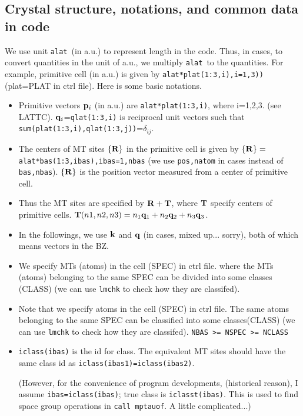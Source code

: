 \documentclass[a4paper,10pt,epsf,fleqn]{article}
\def\bfp{{\bf p}}
\newcommand{\bfq}{{\bf q}}
\newcommand{\bfk}{{\bf k}}
\newcommand{\bfT}{{\bf T}}
\newcommand{\bfR}{{\bf R}}
\newcommand{\io}[1]{{\sf  #1}}
\newcommand{\raw}[1]{{\tt #1}}
\newcommand{\alat}{{\raw{alat}}}
\begin{document}
\subsection{Crystal structure, notations, and common data in code}
\label{how to represent crystalstructure and symmetry}
We use unit \alat\ (in a.u.) to represent length in the code.
Thus, in cases, to convert quantities in the unit of a.u., we
multiply \alat\ to the quantities.
For example, primitive cell (in a.u.) is given by 
\verb!alat*plat(1:3,i),i=1,3))! (plat=PLAT in ctrl file).
Here is some basic notations.
\begin{itemize}
\item
Primitive vectors $\bfp_i$ (in a.u.) are
\raw{alat*plat(1:3,i)}, where i=1,2,3. (see \io{LATTC}).
$\bfq_i$=\raw{qlat(1:3,i)} is reciprocal unit vectors such that
\raw{sum(plat(1:3,i),qlat(1:3,j))}=$\delta_{ij}$.

\item
The centers of MT sites $\{\bfR\}$ in the primitive cell
is given by $\{\bfR\}=$\raw{alat*bas(1:3,ibas),ibas=1,nbas} 
(we use \verb#pos,natom# in cases instead of \verb#bas,nbas#).
$\{\bfR\}$ is the position vector measured from 
a center of primitive cell.

\item
Thus the MT sites are specified by $\bfR+\bfT$, where $\bfT$ specify
centers of primitive 
cells. $\bfT(n1,n2,n3)=n_1 \bfq_1+n_2 \bfq_2 + n_3 \bfq_3$.

\item
In the followings, we use $\bfk$ and $\bfq$
(in cases, mixed up... sorry), both of
which means vectors in the BZ.

\item
  We specify MTs (atoms) in the cell (SPEC) in ctrl file.
  where the MTs (atoms) belonging to the same SPEC can be
  divided into some classes (CLASS)
  (we can use \raw{lmchk} to check how they are classifed).

 \item
  Note that we specify atoms in the cell (SPEC) in ctrl file.
  The same atoms belonging to the same SPEC can be
  classified into some classes(CLASS)
  (we can use \raw{lmchk} to check how they are classifed).
  \raw{NBAS >= NSPEC >= NCLASS}
  
\item
\verb#iclass(ibas)# is the id for class. The equivalent
MT sites should have the same class id as \verb#iclass(ibas1)=iclass(ibas2)#. 

(However, for the convenience of program developments,
(historical reason), I assume {\tt ibas=iclass(ibas)}; true class
is {\tt iclasst(ibas)}. This is used to find space group operations
in \verb#call mptauof#. A little complicated...)
  
\end{itemize}
\end{document}
